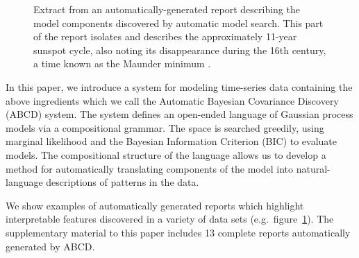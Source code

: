 \documentclass[letterpaper]{article}
\begin{document}
\begin{figure}[t]
\centering
{}
\caption{Extract from an automatically-generated report describing the model components discovered by automatic model search.  This part of the report isolates and describes the approximately 11-year sunspot cycle, also noting its disappearance during the 16th century, a time known as the Maunder minimum \citep{lean1995reconstruction}.}
\label{fig:periodic}
\end{figure}

In this paper,  we introduce a system for modeling time-series data
 containing the above ingredients which we call the Automatic
Bayesian Covariance Discovery (ABCD) system. The system defines an open-ended
language of Gaussian process models via a compositional grammar. The
space is searched greedily, using marginal likelihood and
the Bayesian Information Criterion (BIC) to evaluate models. The 
compositional structure of the language allows us to develop a method
for automatically translating components of the model into
natural-language descriptions of patterns in the data.

We show examples of automatically generated reports which highlight
interpretable features discovered in a variety of data sets (e.g.\
figure~\ref{fig:periodic}).  The supplementary material to this paper
includes 13 complete reports automatically generated by ABCD.
\end{document}
